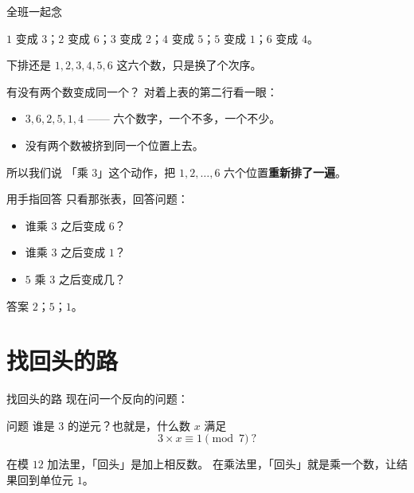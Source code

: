 \documentclass[10pt]{beamer}
\begin{document}
\begin{frame}{全班一起念}
  \begin{center}
    {\large \(1\) 变成 \(3\)；\(2\) 变成 \(6\)；\(3\) 变成 \(2\)；\(4\) 变成 \(5\)；\(5\) 变成 \(1\)；\(6\) 变成 \(4\)。}
  \end{center}
  \pause
  \begin{center}
    {\large 下排还是 \(1,2,3,4,5,6\) 这六个数，只是换了个次序。}
  \end{center}
\end{frame}

\begin{frame}{有没有两个数变成同一个？}
  对着上表的第二行看一眼：
  \pause
  \begin{itemize}
    \item \(3,6,2,5,1,4\) —— 六个数字，一个不多，一个不少。
    \item 没有两个数被挤到同一个位置上去。
  \end{itemize}
  \pause
  \begin{block}{所以我们说}
    「乘 \(3\)」这个动作，把 \(1,2,\dots,6\) 六个位置\textbf{重新排了一遍}。
  \end{block}
\end{frame}

\begin{frame}{用手指回答}
  只看那张表，回答问题：
  \begin{itemize}
    \item 谁乘 \(3\) 之后变成 \(6\)？
    \item 谁乘 \(3\) 之后变成 \(1\)？
    \item \(5\) 乘 \(3\) 之后变成几？
  \end{itemize}
  \pause
  \begin{block}{答案}
    \(2\)；\quad \(5\)；\quad \(1\)。
  \end{block}
\end{frame}

\section{找回头的路}

\begin{frame}{找回头的路}
  现在问一个反向的问题：
  \begin{block}{问题}
    谁是 \(3\) 的逆元？也就是，什么数 \(x\) 满足
    \[
      3\times x\equiv 1 \pmod 7 \ ?
    \]
  \end{block}
  \pause
  在模 \(12\) 加法里，「回头」是加上相反数。\pause
  在乘法里，「回头」就是乘一个数，让结果回到单位元 \(1\)。
\end{frame}
\end{document}
